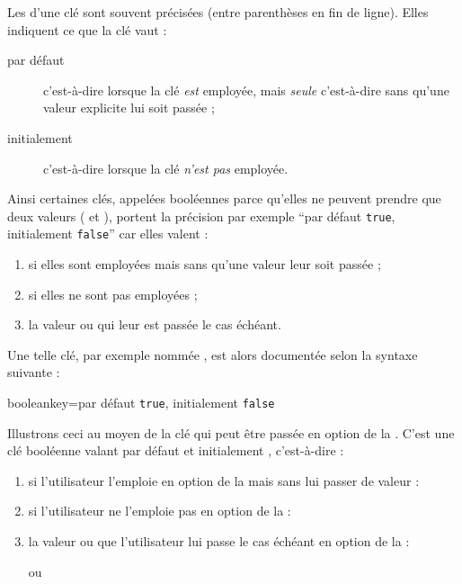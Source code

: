 Les  d'une clé sont souvent précisées
(entre parenthèses en fin de ligne). Elles indiquent ce que la clé vaut :
\begin{description}
\item[par défaut] c'est-à-dire lorsque la clé \emph{est} employée, mais
  \emph{seule} c'est-à-dire sans qu'une valeur explicite lui soit passée ;
\item[initialement] c'est-à-dire lorsque la clé \emph{n'est pas} employée.
\end{description}
%
Ainsi certaines clés, appelées booléennes parce qu'elles ne peuvent prendre que
deux valeurs ( et ), portent la précision par
exemple \enquote{par défaut \lstinline+true+, initialement \lstinline+false+}
car elles valent :
\begin{enumerate}
\item {} si elles sont employées mais sans qu'une valeur leur
  soit passée ;
\item {} si elles ne sont pas employées ;
\item la valeur  ou  qui leur est passée le
  cas échéant.
\end{enumerate}
Une telle clé, par exemple nommée , est alors documentée selon la
syntaxe suivante :
\begin{docKey*}{booleankey}{=\textbar{}}{par
    défaut \lstinline+true+, initialement \lstinline+false+}
\end{docKey*}

Illustrons ceci au moyen de la clé  qui peut être passée en
option de la \yatCl{}. C'est une clé booléenne valant par défaut 
et initialement , c'est-à-dire :
\begin{enumerate}
\item {} si l'utilisateur l'emploie en option de la \yatCl{} mais
  sans lui passer de valeur :
\item {} si l'utilisateur ne l'emploie pas en option de la \yatCl{} :
\item la valeur  ou  que l'utilisateur lui
  passe le cas échéant en option de la \yatCl{} :
ou
\end{enumerate}

